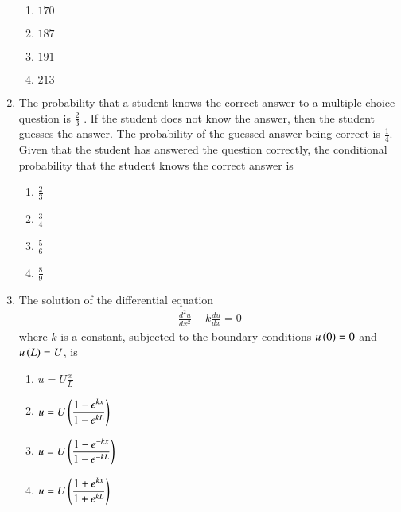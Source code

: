 \documentclass[journal]{IEEEtran}
\numberwithin{equation}{enumi}
\numberwithin{figure}{enumi}
\begin{document}
\begin{enumerate}
    \begin{multicols}{4}
        \begin{enumerate}
            \item $170$
            \item $187$
            \item $191$
            \item $213$
        \end{enumerate}
    \end{multicols}

    \item
    The probability that a student knows the correct answer to a multiple choice question is $\frac{2}{3}$ . If the student does not know the answer, then the student guesses the answer. The probability of the guessed answer being correct is $\frac{1}{4}$. Given that the student has answered the question correctly, the conditional probability that the student knows the correct answer is
    \hfill{}

    \begin{multicols}{4}
        \begin{enumerate}
            \item $\frac{2}{3}$
            \item $\frac{3}{4}$
            \item $\frac{5}{6}$
            \item $\frac{8}{9}$
        \end{enumerate}
    \end{multicols}

    \item 
    The solution of the differential equation 
    \begin{align*}
        \frac{d^2u}{dx^2} - k\frac{du}{dx} = 0
    \end{align*}
    where $k$ is a constant, subjected to the boundary conditions $u\left(0\right) = 0$ and $u\left(L\right) = U$, is 
    \hfill{}

    \begin{multicols}{2}
        \begin{enumerate}
            \item $u = \displaystyle U \frac{x}{L}$
            \item $u = \displaystyle U\left(\frac{1-e^{kx}}{1-e^{kL}}\right)$
            \item $u = \displaystyle U\left(\frac{1-e^{-kx}}{1-e^{-kL}}\right)$
            \item $u = \displaystyle U\left(\frac{1+e^{kx}}{1+e^{kL}}\right)$
        \end{enumerate}
    \end{multicols}


\end{enumerate}
\end{document}

